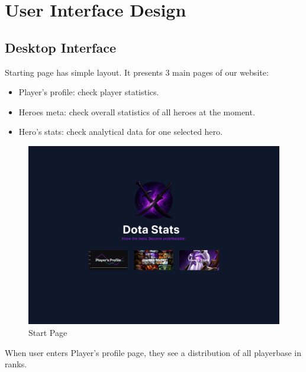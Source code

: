 \section{User Interface Design}

    \subsection{Desktop Interface}

    Starting page has simple layout.
    It presents 3 main pages of our website:
    \begin{itemize}
        \item Player's profile: check player statistics.
        \item Heroes meta: check overall statistics of all heroes at the moment.
        \item Hero's stats: check analytical data for one selected hero.
    \end{itemize}


    \begin{figure}[ht]
        \centering
        \includegraphics[width=\textwidth]{images/Start}
        \caption{Start Page}
    \end{figure}

    When user enters Player's profile page, they see a distribution of all playerbase in ranks.


